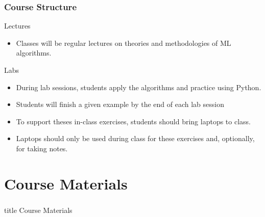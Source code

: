\documentclass{beamer}
\begin{document}
\begin{frame}\frametitle{Course Structure}

 Lectures
 \begin{itemize}
 \item Classes will be regular lectures on theories and methodologies of ML algorithms.
    \end{itemize}
    \vspace{2ex}
Labs
    \begin{itemize}
        \item During lab sessions, students apply the algorithms and practice using Python.
        \item Students will
finish a given example by the end of each lab session
\item To support theses in-class exercises,
students should bring laptops to class.
\item Laptops should only be used during class for these exercises and, optionally,
for taking notes. 
    \end{itemize}
\end{frame}

\section{Course Materials}
\label{materials}
\begin{frame}\frametitle{}
    \vfill
    \centering
    \begin{beamercolorbox}[center]{title}
        \Large Course Materials
    \end{beamercolorbox}
    \vfill
\end{frame}
\end{document}
